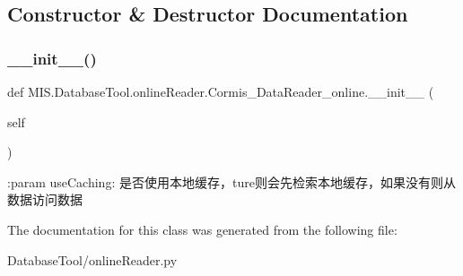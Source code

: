 \subsection{Constructor \& Destructor Documentation}
\mbox{\label{classMIS_1_1DatabaseTool_1_1onlineReader_1_1Cormis__DataReader__online_a6088d1e63aca24b4a72dffe33e58273b}} 
\subsubsection{\texorpdfstring{\+\_\+\+\_\+init\+\_\+\+\_\+()}{\_\_init\_\_()}}
{\footnotesize\ttfamily def M\+I\+S.\+Database\+Tool.\+online\+Reader.\+Cormis\+\_\+\+Data\+Reader\+\_\+online.\+\_\+\+\_\+init\+\_\+\+\_\+ (\begin{DoxyParamCaption}\item[{}]{self }\end{DoxyParamCaption})}

\begin{DoxyVerb}:param useCaching: 是否使用本地缓存，ture则会先检索本地缓存，如果没有则从数据访问数据
\end{DoxyVerb}
 

The documentation for this class was generated from the following file\+:\begin{DoxyCompactItemize}
\item 
Database\+Tool/online\+Reader.\+py\end{DoxyCompactItemize}
